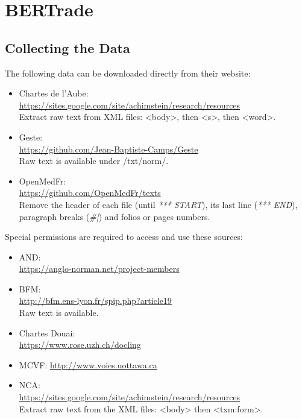 \chapter{BERTrade}\label{app:bertrade}

\section{Collecting the Data}
\label{subsec:collectdata}
The following data can be downloaded directly from their website:
\begin{itemize}
    \item Chartes de l'Aube: \\ \url{https://sites.google.com/site/achimstein/research/resources} \\
          Extract raw text from XML files: <body>, then <s>, then <word>.
    \item Geste: \\ \url{https://github.com/Jean-Baptiste-Camps/Geste} \\
          Raw text is available under /txt/norm/.
    \item OpenMedFr: \\ \url{https://github.com/OpenMedFr/texts} \\
          Remove the header of each file (until \textit{*** START}), its last line (\textit{*** END}), paragraph breaks (\textit{\#|}) and folios or pages numbers.
\end{itemize}

Special permissions are required to access and use these sources:
\begin{itemize}
    \item AND: \\ \url{https://anglo-norman.net/project-members}
    \item BFM: \\ \url{http://bfm.ens-lyon.fr/spip.php?article19} \\
          Raw text is available.
    \item Chartes Douai: \\
          \url{https://www.rose.uzh.ch/docling}
    \item MCVF: \url{http://www.voies.uottawa.ca}
    \item NCA: \\ \url{https://sites.google.com/site/achimstein/research/resources} \\
          Extract raw text from the XML files: <body> then <txm:form>.
\end{itemize}


